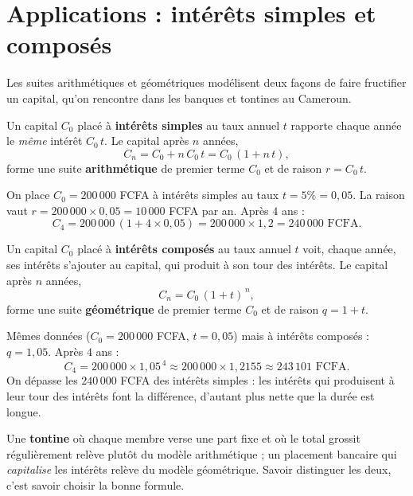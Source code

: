 \section{Applications : intérêts simples et composés}

Les suites arithmétiques et géométriques modélisent deux façons de faire fructifier un
capital, qu'on rencontre dans les banques et tontines au Cameroun.

\begin{propriete}
Un capital $C_0$ placé à \textbf{intérêts simples} au taux annuel $t$ rapporte chaque
année le \emph{même} intérêt $C_0\,t$. Le capital après $n$ années,
\[ C_n=C_0+n\,C_0\,t=C_0\,(1+n\,t), \]
forme une suite \textbf{arithmétique} de premier terme $C_0$ et de raison $r=C_0\,t$.
\end{propriete}

\begin{exemple}
On place $C_0=200\,000$ FCFA à intérêts simples au taux $t=5\%=0{,}05$. La raison vaut
$r=200\,000\times 0{,}05=10\,000$ FCFA par an. Après $4$ ans :
\[ C_4=200\,000\,(1+4\times 0{,}05)=200\,000\times 1{,}2=240\,000 \text{ FCFA}. \]
\end{exemple}

\begin{propriete}
Un capital $C_0$ placé à \textbf{intérêts composés} au taux annuel $t$ voit, chaque
année, ses intérêts s'ajouter au capital, qui produit à son tour des intérêts. Le
capital après $n$ années,
\[ C_n=C_0\,(1+t)^{\,n}, \]
forme une suite \textbf{géométrique} de premier terme $C_0$ et de raison $q=1+t$.
\end{propriete}

\begin{exemple}
Mêmes données ($C_0=200\,000$ FCFA, $t=0{,}05$) mais à intérêts composés : $q=1{,}05$.
Après $4$ ans :
\[ C_4=200\,000\times 1{,}05^{\,4}\approx 200\,000\times 1{,}2155\approx 243\,101 \text{ FCFA}. \]
On dépasse les $240\,000$ FCFA des intérêts simples : les intérêts qui produisent à leur
tour des intérêts font la différence, d'autant plus nette que la durée est longue.
\end{exemple}

\begin{remarque}
Une \textbf{tontine} où chaque membre verse une part fixe et où le total grossit
régulièrement relève plutôt du modèle arithmétique ; un placement bancaire qui
\emph{capitalise} les intérêts relève du modèle géométrique. Savoir distinguer les deux,
c'est savoir choisir la bonne formule.
\end{remarque}

